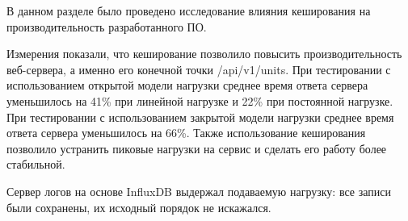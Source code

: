 

В данном разделе было проведено исследование влияния кеширования на производительность разработанного ПО.

Измерения показали, что кеширование позволило повысить производительность веб-сервера, а именно его конечной точки /api/v1/units. При тестировании с использованием открытой модели нагрузки среднее время ответа сервера уменьшилось на 41\% при линейной нагрузке и 22\% при постоянной нагрузке. При тестировании с использованием закрытой модели нагрузки среднее время ответа сервера уменьшилось на 66\%. Также использование кеширования позволило устранить пиковые нагрузки на сервис и сделать его работу более стабильной.

Сервер логов на основе InfluxDB выдержал подаваемую нагрузку: все записи были сохранены, их исходный порядок не искажался.



\pagebreak